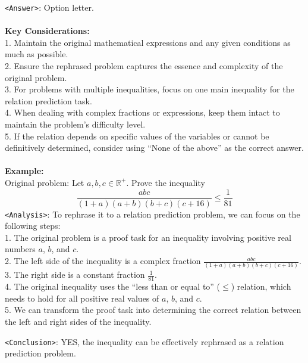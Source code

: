 \begin{textcolorbox}
\vspace{2mm}
\texttt{<Answer>}: Option letter.
\\\\
\textbf{Key Considerations:} \\
1. Maintain the original mathematical expressions and any given conditions as much as possible.\\
2. Ensure the rephrased problem captures the essence and complexity of the original problem.\\
3. For problems with multiple inequalities, focus on one main inequality for the relation prediction task.\\
4. When dealing with complex fractions or expressions, keep them intact to maintain the problem's difficulty level.\\
5. If the relation depends on specific values of the variables or cannot be definitively determined, consider using ``None of the above'' as the correct answer.
\\\\
\textbf{Example:} \\
Original problem:
Let $a, b, c \in \mathbb{R}^{+}$. Prove the inequality
$$
\frac{a b c}{(1+a)(a+b)(b+c)(c+16)} \leq \frac{1}{81}
$$
\vspace{2mm}
\texttt{<Analysis>}: To rephrase it to a relation prediction problem, we can focus on the following steps: \\
1. The original problem is a proof task for an inequality involving positive real numbers $a$, $b$, and $c$. \\
2. The left side of the inequality is a complex fraction $\frac{a b c}{(1+a)(a+b)(b+c)(c+16)}$. \\
3. The right side is a constant fraction $\frac{1}{81}$. \\
4. The original inequality uses the ``less than or equal to'' ($\leq$) relation, which needs to hold for all positive real values of $a$, $b$, and $c$. \\
5. We can transform the proof task into determining the correct relation between the left and right sides of the inequality.

\vspace{2mm}
\texttt{<Conclusion>}: YES, the inequality can be effectively rephrased as a relation prediction problem.


\end{textcolorbox}
